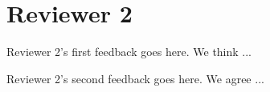 \section*{Reviewer 2}

\begin{feedback}[1]
Reviewer 2's first feedback goes here.
%
\response
%
We think ...
\end{feedback}

\begin{feedback}[2]
Reviewer 2's second feedback goes here.
%
\response
%
We agree ...
\end{feedback}
